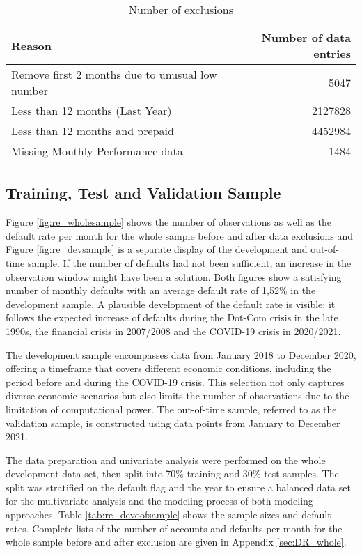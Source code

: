 \begin{table}[H]
\centering
\begin{tabular}{ l r }\toprule          										
\textbf{Reason}                                       	& \textbf{Number of data entries} 	\\\midrule
Remove first 2 months due to unusual low number 		& 5047                   			\\
Less than 12 months (Last Year)                 		& 2127828                			\\
Less than 12 months and prepaid                 		& 4452984                			\\
Missing Monthly Performance data                		& 1484  				 			\\\bottomrule
\end{tabular}%
\caption{Number of exclusions}
\label{tab:re_nr_excl}
\end{table}

\subsection{Training, Test and Validation Sample}
Figure \ref{fig:re_wholesample} shows the number of observations as well as the default rate per month for the whole sample before and after data exclusions and Figure \ref{fig:re_devsample} is a separate display of the development and out-of-time sample. If the number of defaults had not been sufficient, an increase in the observation window might have been a solution. Both figures show a satisfying number of monthly defaults with an average default rate of 1,52\% in the development sample. A plausible development of the default rate is visible; it follows the expected increase of defaults during the Dot-Com crisis in the late 1990s, the financial crisis in 2007/2008 and the COVID-19 crisis in 2020/2021. 

The development sample encompasses data from January 2018 to December 2020, offering a timeframe that covers different economic conditions, including the period before and during the COVID-19 crisis. This selection not only captures diverse economic scenarios but also limits the number of observations due to the limitation of computational power. The out-of-time sample, referred to as the validation sample, is constructed using data points from January to December 2021.

The data preparation and univariate analysis were performed on the whole development data set, then split into 70\% training and 30\% test samples. The split was stratified on the default flag and the year to ensure a balanced data set for the multivariate analysis and the modeling process of both modeling approaches. Table \ref{tab:re_devoofsample} shows the sample sizes and default rates. Complete lists of the number of accounts and defaults per month for the whole sample before and after exclusion are given in Appendix \ref{sec:DR_whole}.

